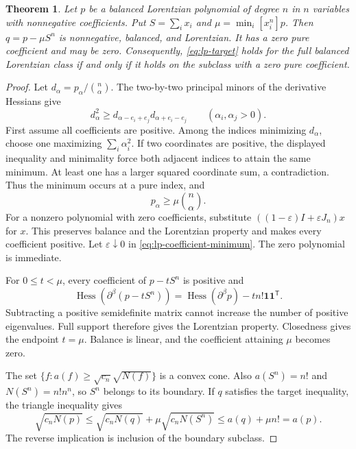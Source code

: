 \documentclass[11pt,a4paper]{article}
\newtheorem{theorem}{Theorem}[section]
\theoremstyle{definition}
\theoremstyle{remark}
\newcommand{\T}{\mathsf{T}}
\begin{document}
\begin{theorem}\label{thm:lp-boundary-subtraction}
Let $p$ be a balanced Lorentzian polynomial of degree $n$ in $n$ variables with nonnegative coefficients.
Put $S=\sum_i x_i$ and $\mu=\min_i[x_i^n]p$.
Then $q=p-\mu S^n$ is nonnegative, balanced, and Lorentzian.
It has a zero pure coefficient and may be zero.
Consequently, \eqref{eq:lp-target} holds for the full balanced Lorentzian class if and only if it holds on the subclass with a zero pure coefficient.
\end{theorem}
\begin{proof}
Let $d_\alpha=p_\alpha/\binom n\alpha$.
The two-by-two principal minors of the derivative Hessians give
\[
 d_\alpha^2\ge d_{\alpha-e_i+e_j}d_{\alpha+e_i-e_j}
 \qquad(\alpha_i,\alpha_j>0).
\]
First assume all coefficients are positive.
Among the indices minimizing $d_\alpha$, choose one maximizing $\sum_i\alpha_i^2$.
If two coordinates are positive, the displayed inequality and minimality force both adjacent indices to attain the same minimum.
At least one has a larger squared coordinate sum, a contradiction.
Thus the minimum occurs at a pure index, and
\begin{equation}\label{eq:lp-coefficient-minimum}
 p_\alpha\ge\mu\binom n\alpha.
\end{equation}
For a nonzero polynomial with zero coefficients, substitute $((1-\varepsilon)I+\varepsilon J_n)x$ for $x$.
This preserves balance and the Lorentzian property and makes every coefficient positive.
Let $\varepsilon\downarrow0$ in \eqref{eq:lp-coefficient-minimum}.
The zero polynomial is immediate.

For $0\le t<\mu$, every coefficient of $p-tS^n$ is positive and
\[
 \operatorname{Hess}(\partial^\beta(p-tS^n))
 =\operatorname{Hess}(\partial^\beta p)-tn!\mathbf1\mathbf1^\T.
\]
Subtracting a positive semidefinite matrix cannot increase the number of positive eigenvalues.
Full support therefore gives the Lorentzian property.
Closedness gives the endpoint $t=\mu$.
Balance is linear, and the coefficient attaining $\mu$ becomes zero.

The set $\{f:a(f)\ge\sqrt{c_n}\sqrt{N(f)}\}$ is a convex cone.
Also $a(S^n)=n!$ and $N(S^n)=n!n^n$, so $S^n$ belongs to its boundary.
If $q$ satisfies the target inequality, the triangle inequality gives
\[
 \sqrt{c_nN(p)}\le\sqrt{c_nN(q)}+\mu\sqrt{c_nN(S^n)}
 \le a(q)+\mu n!=a(p).
\]
The reverse implication is inclusion of the boundary subclass.
\end{proof}
\end{document}
